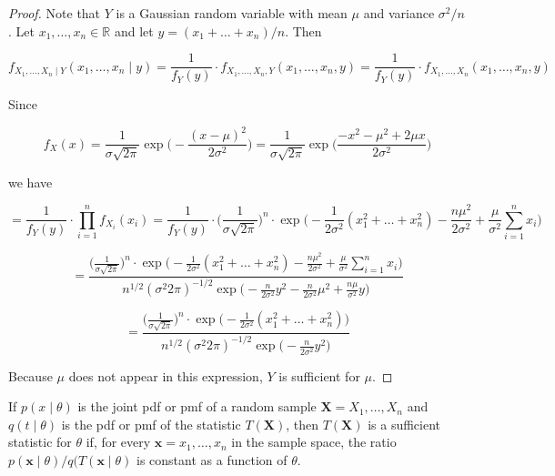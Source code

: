 \begin{proof} Note that \(Y\) is a Gaussian random variable with mean \(\mu\) and variance \(\sigma^2/n\). Let \(x_1, \ldots, x_n \in \mathbb{R}\) and let \(y = (x_1 + \ldots + x_n)/n\). Then

\[
f_{X_1, \ldots, X_n \mid Y}(x_1, \ldots, x_n \mid y) = \frac{1}{f_Y(y)} \cdot f_{X_1, \ldots , X_n, Y} (x_1, \ldots, x_n, y) = \frac{1}{f_Y(y)} \cdot f_{X_1, \ldots , X_n} (x_1, \ldots, x_n, y)
\]

Since

\[
f_X(x) = \frac{1}{\sigma \sqrt{2 \pi}} \exp \bigg(-\frac{ (x-\mu)^2}{2 \sigma^2} \bigg)  = \frac{1}{\sigma \sqrt{2 \pi}} \exp \bigg(\frac{ -x^2 - \mu^2 + 2 \mu x}{2 \sigma^2} \bigg) 
\]

we have

\[
= \frac{1}{f_Y(y)} \cdot \prod_{i=1}^n f_{X_i}(x_i) = \frac{1}{f_Y(y)} \cdot \bigg( \frac{1}{\sigma \sqrt{2 \pi}} \bigg)^n \cdot \exp \bigg( - \frac{1}{2 \sigma^2}(x_1^2 + \ldots + x_n^2) - \frac{n \mu^2}{2 \sigma^2} + \frac{\mu}{\sigma^2} \sum_{i=1}^n x_i\bigg)
\]

\[
= \frac{ \bigg( \frac{1}{\sigma \sqrt{2 \pi}} \bigg)^n \cdot \exp \bigg( - \frac{1}{2 \sigma^2}(x_1^2 + \ldots + x_n^2) - \frac{n \mu^2}{2 \sigma^2} + \frac{\mu}{\sigma^2} \sum_{i=1}^n x_i\bigg) } {n^{1/2} (\sigma^2 2 \pi)^{-1/2} \exp \bigg( - \frac{n}{2 \sigma^2} y^2 - \frac{n}{2 \sigma^2} \mu^2 + \frac{n \mu}{\sigma^2} y \bigg) }
\]

\[
= \frac{ \bigg( \frac{1}{\sigma \sqrt{2 \pi}} \bigg)^n \cdot \exp \bigg( - \frac{1}{2 \sigma^2}(x_1^2 + \ldots + x_n^2)\bigg) } {n^{1/2} (\sigma^2 2 \pi)^{-1/2} \exp \bigg( - \frac{n}{2 \sigma^2} y^2  \bigg) }
\]

Because \(\mu\) does not appear in this expression, \(Y\) is sufficient for \(\mu\).

\end{proof}

\begin{theorem} If \(p(x \mid \theta)\) is the joint pdf or pmf of a random sample \(\boldsymbol{X} = X_1, \ldots, X_n\) and \(q(t\mid \theta)\) is the pdf or pmf of the statistic \(T(\boldsymbol{X})\), then \(T(\boldsymbol{X})\) is a sufficient statistic for \(\theta\) if, for every \(\boldsymbol{x} = x_1, \ldots, x_n\) in the sample space, the ratio \(p(\boldsymbol{x} \mid \theta)/q(T(\boldsymbol{x} \mid \theta)\) is constant as a function of \(\theta\).

\end{theorem}

